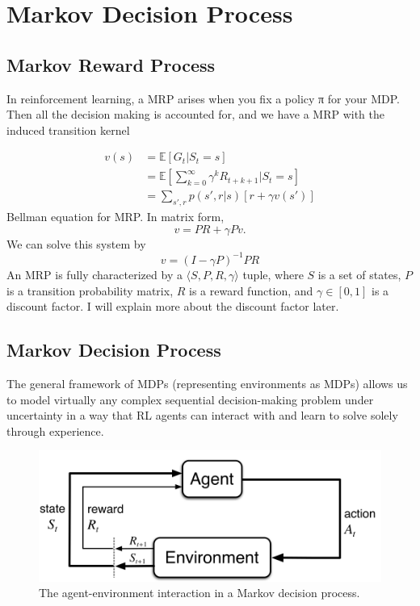 \chapter{Markov Decision Process}

\section{Markov Reward Process}
In reinforcement learning, a MRP arises when you fix a policy π for your MDP. Then all the decision making is accounted for, and we have a MRP with the induced transition kernel

\begin{align*}
	v(s)&=\mathbb{E}[G_t|S_t=s]\\
		&=\mathbb{E}\left[\sum_{k=0}^\infty \gamma^kR_{t+k+1}|S_t=s\right]\\
		&= \sum_{s',r}p(s',r|s)[r+\gamma v(s')]
\end{align*} 
Bellman equation for MRP. In matrix form,
$$v = PR+\gamma Pv.$$
We can solve this system by
$$v = (I-\gamma P)^{-1}PR$$
An MRP is fully characterized by a $\langle S,P,R,\gamma \rangle$ tuple, where $S$ is a set of states, $P$ is a transition probability matrix, $R$ is a reward function, and $\gamma\in[0,1]$  is a discount factor. I will explain more about the discount factor later. 


\section{Markov Decision Process}

The general framework of MDPs (representing environments as MDPs) allows us to model virtually any complex sequential decision-making problem under uncertainty in a way that RL agents can interact with and learn to solve solely through experience. 

\begin{figure}[h]
	\centering
	\includegraphics[scale=0.3]{./images/mdp.png}
	\caption{The agent-environment interaction in a Markov decision process.}
	\label{fig:mdp_ill}
\end{figure}

